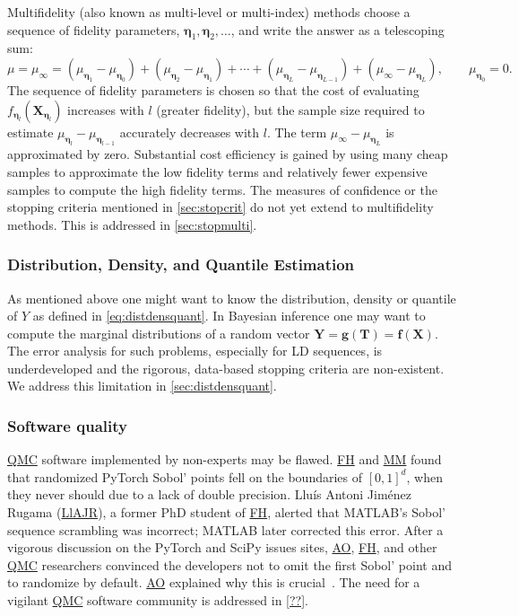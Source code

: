 \documentclass[11pt]{NSFamsart}
\newcommand{\FH}{\hyperlink{FHlink}{FH}\xspace}
\newcommand{\AO}{\hyperlink{AOlink}{AO}\xspace}
\newcommand{\MM}{\hyperlink{MMlink}{MM}\xspace}
\newcommand{\LlAJR}{\hyperlink{LlAJRlink}{LlAJR}\xspace}
\newcommand{\QMC}{\hyperlink{QMClink}{QMC}\xspace}
\newcommand{\SciPy}{SciPy\xspace}
\newcommand{\MATLAB}{MATLAB\xspace}
\newcommand{\PyTorch}{PyTorch\xspace}
\newcommand{\fidparam}{\bldeta}
\newcommand{\bff}{{\boldsymbol{f}}}
\newcommand{\bT}{{\boldsymbol{T}}}
\newcommand{\bX}{{\boldsymbol{X}}}
\newcommand{\bg}{{\boldsymbol{g}}}
\newcommand{\bY}{{\boldsymbol{Y}}}
\newcommand{\bldeta}{{\boldsymbol{\eta}}}
\begin{document}
Multifidelity (also known as multi-level or multi-index) methods \cite{Hei01a, Gil15a, HajNobTem16a} choose a sequence of fidelity parameters, $\fidparam_1, \fidparam_2, \ldots$, and write the  answer as a telescoping sum: 
\[
\mu = \mu_\infty = (\mu_{\fidparam_1} - \mu_{\fidparam_0}) + (\mu_{\fidparam_2} - \mu_{\fidparam_1}) + \cdots +
(\mu_{\fidparam_L} - \mu_{\fidparam_{L-1}}) + (\mu_{\infty} - \mu_{\fidparam_{L}}), \qquad \mu_{\fidparam_0} = 0.
\]
The sequence of fidelity parameters is chosen so that the cost of evaluating $f_{\fidparam_l}(\bX_{\fidparam_l})$  increases with $l$ (greater fidelity), but  the sample size required to estimate $\mu_{\fidparam_l} - \mu_{\fidparam_{l-1}}$ accurately decreases with $l$. The term  $\mu_{\infty} - \mu_{\fidparam_{L}}$ is approximated by zero. Substantial cost efficiency is gained by using many cheap samples to approximate the low fidelity terms and relatively fewer expensive samples to compute the high fidelity terms.  The measures of confidence or the stopping criteria mentioned in  \cref{sec:stopcrit} do not yet extend to multifidelity methods.  This is addressed in  \cref{sec:stopmulti}.

\subsubsection{Distribution, Density, and Quantile Estimation} As mentioned above one might want to know  the distribution, density or quantile of $Y$ as defined in \cref{eq:distdensquant}.  In Bayesian inference one may want to compute the marginal distributions of a random vector $\bY = \bg(\bT) = \bff(\bX)$.  The error analysis for such problems, especially for LD sequences, is underdeveloped and the rigorous, data-based stopping criteria are non-existent. We address this limitation in  \cref{sec:distdensquant}.

\subsubsection{Software quality} \QMC software implemented by non-experts may be flawed.  \FH and \MM found  that randomized \PyTorch Sobol' points fell on the boundaries of $[0,1]^d$, when they never should \cite{PyTorchFirstPt2020a} due to a lack of double precision.  \hypertarget{LlAJRlink}{Llu\'is Antoni Jim\'enez Rugama} (\LlAJR), a former PhD student of \FH,  alerted  that \MATLAB's Sobol' sequence scrambling was incorrect; \MATLAB later corrected this error.  After a vigorous discussion on the \PyTorch \cite{PyTorchFirstPt2020a} and  \SciPy  \cite{scipySobol2020a} issues sites, \AO, \FH, and other \QMC researchers convinced the developers not to omit the first Sobol' point and to randomize by default. \AO explained why this is crucial~\cite{owen2020dropping}.   The need for a vigilant \QMC software community is addressed in  \cref{??}.
\end{document}

